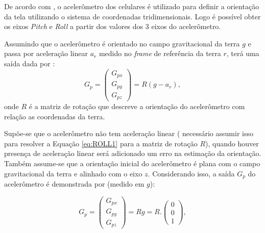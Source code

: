         
        De acordo com , o acelerômetro dos celulares é utilizado para definir a orientação da tela utilizando o sistema de coordenadas tridimensionais. Logo é possível obter os eixos \textit{Pitch} e \textit{Roll} a partir dos valores dos 3 eixos do acelerômetro.
        
        Assumindo que o acelerômetro é orientado no campo gravitacional da terra $g$ e passa por aceleração linear $a_r$ medido no \textit{frame} de referência da terra $r$, terá uma saída dada por \cite{nxp:acell}:
        \begin{equation}
            G_p = 
            \begin{pmatrix}
                G_{px} \\
                G_{py} \\
                G_{pz}
            \end{pmatrix}    
             = R (g - a_r),
            \label{eq:ROLL1}
        \end{equation}
        onde $R$ é a matriz de rotação que descreve a orientação do acelerômetro com relação as coordenadas da terra.
        
        
        Supõe-se que o acelerômetro não tem aceleração linear ( necessário assumir isso para resolver a Equação \ref{eq:ROLL1} para a matriz de rotação $R$), quando houver presença de aceleração linear será adicionado um erro na estimação da orientação. Também assume-se que a orientação inicial do acelerômetro é plana com o campo gravitacional da terra e alinhado com o eixo $z$. Considerando isso, a saída $G_p$ do acelerômetro é demonstrada por \cite{nxp:acell} (medido em $g$):	
        
        \begin{equation}
            G_p = 
            \begin{pmatrix}
                G_{px} \\
                G_{py} \\
                G_{pz}
            \end{pmatrix}    
             = Rg = R.
             \begin{pmatrix}
                0 \\
                0 \\
                1
             \end{pmatrix}
            \label{eq:ROLL2}
            ,
        \end{equation}
        

